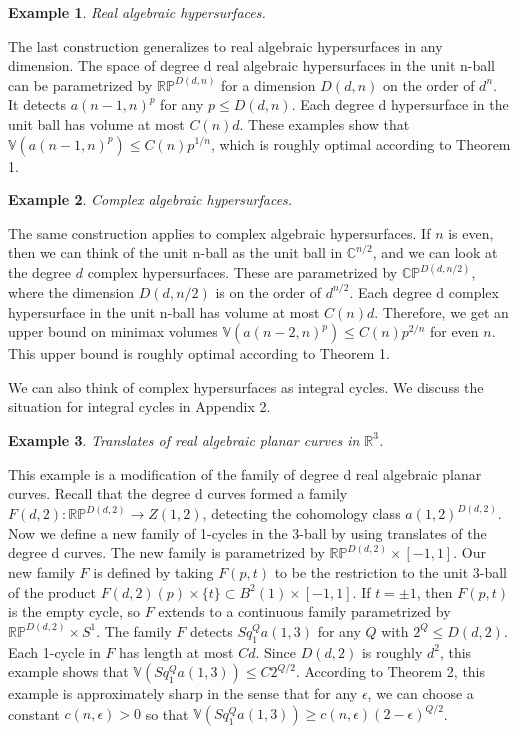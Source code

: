 \documentclass{amsart}
\newtheorem*{Theorem 1}{Theorem 1}
\newtheorem*{Theorem 2}{Theorem 2}
\newtheorem*{Theorem 1A}{Theorem 1A}
\newtheorem*{Theorem 2A}{Theorem 2A}
\newtheorem{introexample}{Example}
\newtheorem*{vanishing lemma}{Vanishing Lemma}
\numberwithin{equation}{section}
\begin{document}
\begin{introexample} Real algebraic hypersurfaces.
\end{introexample}

The last construction generalizes to real algebraic hypersurfaces
in any dimension.  The space of degree d real algebraic
hypersurfaces in the unit n-ball can be parametrized by
$\mathbb{RP}^{D(d,n)}$ for a dimension $D(d,n)$ on the order of
$d^n$.  It detects $a(n-1,n)^p$ for any $p \le D(d,n)$.  Each
degree d hypersurface in the unit ball has volume at most $C(n)
d$.  These examples show that $\mathbb{V}(a(n-1,n)^p) \le C(n)
p^{1/n}$, which is roughly optimal according to Theorem 1.

\begin{introexample} Complex algebraic hypersurfaces.
\end{introexample}

The same construction applies to complex algebraic hypersurfaces. 
If $n$ is even, then we can think of the unit n-ball as the unit
ball in $\mathbb{C}^{n/2}$, and we can look at the degree $d$
complex hypersurfaces.  These are parametrized by
$\mathbb{CP}^{D(d,n/2)}$, where the dimension $D(d,n/2)$ is on the
order of $d^{n/2}$.  Each degree d complex hypersurface in the
unit n-ball has volume at most $C(n) d$.  Therefore, we get an
upper bound on minimax volumes $\mathbb{V}(a(n-2,n)^p) \le C(n)
p^{2/n}$ for even $n$.  This upper bound is roughly optimal
according to Theorem 1.

We can also think of complex hypersurfaces as integral cycles. 
We discuss the situation for integral cycles in Appendix 2.

\begin{introexample} Translates of real algebraic planar curves
in $\mathbb{R}^3$.
\end{introexample}

This example is a modification of the family of degree d real
algebraic planar curves.  Recall that the degree d curves formed
a family $F(d,2): \mathbb{RP}^{D(d,2)} \rightarrow Z(1,2)$,
detecting the cohomology class $a(1,2)^{D(d,2)}$.  Now we define
a new family of 1-cycles in the 3-ball by using translates of the
degree d curves.  The new family is parametrized by
$\mathbb{RP}^{D(d,2)} \times [-1, 1]$.  Our new family $F$ is
defined by taking $F(p, t)$ to be the restriction to the unit
3-ball of the product $F(d,2)(p) \times \{ t \} \subset B^2(1)
\times [-1,1]$.  If $t = \pm 1$, then
$F(p,t)$ is the empty cycle, so $F$ extends to a continuous
family parametrized by $\mathbb{RP}^{D(d,2)} \times S^1$.  The
family $F$ detects $Sq_1^Q a(1,3)$ for any $Q$ with $2^Q \le
D(d,2)$.  Each 1-cycle in $F$ has length at most $C d$.  Since
$D(d,2)$ is roughly $d^2$, this example shows that
$\mathbb{V}(Sq_1^Q a(1,3)) \le C 2^{Q/2}$.  According to Theorem
2, this example is approximately sharp in the sense that for any
$\epsilon$, we can choose a constant $c(n, \epsilon) > 0$ so that
$\mathbb{V}(Sq_1^Q a(1,3)) \ge c(n, \epsilon) (2-
\epsilon)^{Q/2}$.
\end{document}
